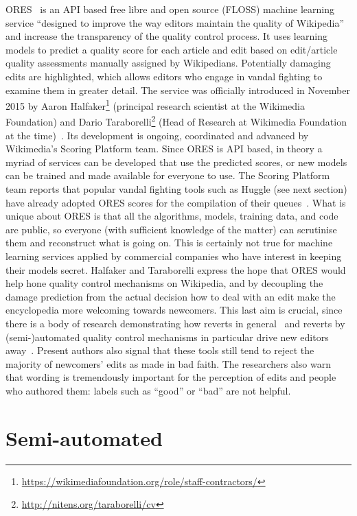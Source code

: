 ORES~\cite{ORES} is an API based free libre and open source (FLOSS) machine learning service ``designed to improve the way editors maintain the quality of Wikipedia'' \cite{HalTar2015} and increase the transparency of the quality control process.
It uses learning models to predict a quality score for each article and edit based on edit/article quality assessments manually assigned by Wikipedians.
Potentially damaging edits are highlighted, which allows editors who engage in vandal fighting to examine them in greater detail.
The service was officially introduced in November 2015 by Aaron Halfaker\footnote{\url{https://wikimediafoundation.org/role/staff-contractors/}} (principal research scientist at the Wikimedia Foundation) and Dario Taraborelli\footnote{\url{http://nitens.org/taraborelli/cv}} (Head of Research at Wikimedia Foundation at the time)~\cite{HalTar2015}.
Its development is ongoing, coordinated and advanced by Wikimedia's Scoring Platform team.
Since ORES is API based, in theory a myriad of services can be developed that use the predicted scores, or new models can be trained and made available for everyone to use.
The Scoring Platform team reports that popular vandal fighting tools such as Huggle (see next section) have already adopted ORES scores for the compilation of their queues~\cite{HalTar2015}.
What is unique about ORES is that all the algorithms, models, training data, and code are public, so everyone (with sufficient knowledge of the matter) can scrutinise them and reconstruct what is going on.
This is certainly not true for machine learning services applied by commercial companies who have interest in keeping their models secret.
Halfaker and Taraborelli express the hope that ORES would help hone quality control mechanisms on Wikipedia, and by decoupling the damage prediction from the actual decision how to deal with an edit make the encyclopedia more welcoming towards newcomers.
This last aim is crucial, since there is a body of research demonstrating how reverts in general~\cite{HalKitRied2011} and reverts by (semi-)automated quality control mechanisms in particular drive new editors away~\cite{HalGeiMorRied2013}.
Present authors also signal that these tools still tend to reject the majority of newcomers' edits as made in bad faith.
The researchers also warn that wording is tremendously important for the perception of edits and people who authored them: labels such as ``good'' or ``bad'' are not helpful.

\section{Semi-automated}
\label{section:semi-automated}

